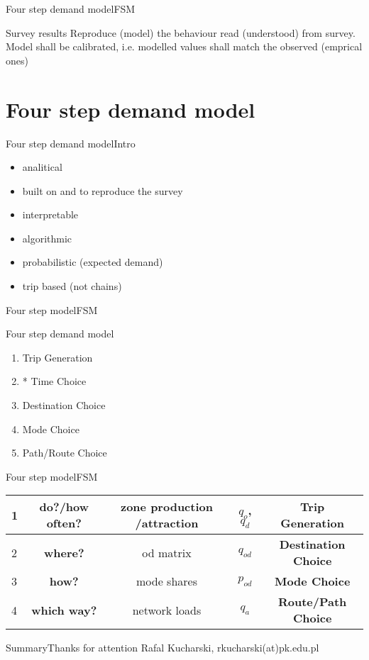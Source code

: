 \documentclass[8pt]{beamer}
\begin{document}
\begin{frame}{Four step demand model}{FSM}
	\begin{block}{Survey results}
		Reproduce (model) the behaviour read (understood) from survey.
		\\
		Model shall be calibrated, i.e. modelled values shall match the observed (emprical ones)
		
	\end{block}	
\end{frame}

\section{Four step demand model}
\begin{frame}{Four step demand model}{Intro}
\begin{itemize}
\item analitical
\item built on and to reproduce the survey
\item interpretable
\item algorithmic 
\item probabilistic (expected demand)
\item trip based (not chains)
\end{itemize}
\end{frame}

\begin{frame}{Four step model}{FSM}
	\begin{block}{Four step demand model}
		\begin{enumerate}
		\item Trip Generation
		\item * Time Choice
		\item Destination Choice
		\item Mode Choice
		\item Path/Route Choice
		\end{enumerate}	
	\end{block}	
\end{frame}


\begin{frame}{Four step model}{FSM}
\begin{table}[]
\begin{tabular}{l|c|c|c|c}
1 & \textbf{do?/how often?} &  zone production /attraction & $q_o$, $q_d$ & \textbf{Trip Generation}\\ \hline 
2 & \textbf{where?} &  od matrix & $q_{od}$ & \textbf{Destination Choice}\\ \hline 
3 & \textbf{how?} &  mode shares  & $p_{od}$ & \textbf{Mode Choice}\\ \hline 
4 & \textbf{which way?} &  network loads & $q_a$ & \textbf{Route/Path Choice}\\ \hline 
\end{tabular}
\end{table}
\end{frame}




\begin{frame}{Summary}{Thanks for attention}
Rafal Kucharski, rkucharski(at)pk.edu.pl
\end{frame}
\end{document}
